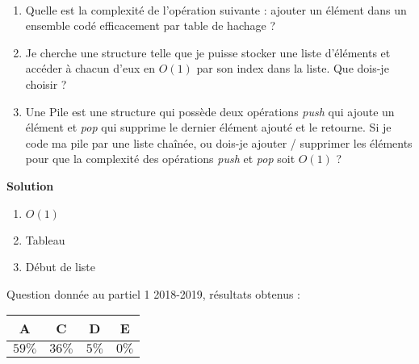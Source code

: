\begin{exercice}~

\begin{enumerate}
\item Quelle est la complexité de l'opération suivante : ajouter un élément dans un ensemble codé efficacement par table de hachage ?
\item Je cherche une structure telle que je puisse stocker une liste d'éléments et accéder à chacun d'eux en $O(1)$ par son index dans la liste. Que dois-je choisir ?
\item Une Pile est une structure qui possède deux opérations \emph{push} qui ajoute un élément et \emph{pop} qui supprime le dernier élément ajouté et le retourne. Si je code ma pile par une liste chaînée, ou dois-je ajouter / supprimer les éléments pour que la complexité des opérations \emph{push} et \emph{pop} soit $O(1)$ ? 
\end{enumerate}


\vspace{0.5cm}

\textbf{Solution}

\begin{enumerate}
\item $O(1)$
\item Tableau
\item Début de liste
\end{enumerate}


Question donnée au partiel 1 2018-2019, résultats obtenus :

\begin{tabular}{|c|c|c|c|}
\hline
A & C & D & E \\ \hline
$59\%$ & $36\%$ & $5\%$ & $0\%$ \\ \hline
\end{tabular} 




\end{exercice}